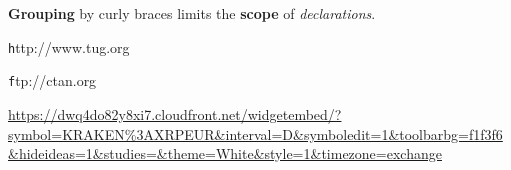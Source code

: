 \documentclass{article}
\newcommand{\keyword}[2][\bfseries]{{#1#2}}
\newcommand{\site}[2][http]{{\texttt #1://#2}}
\begin{document}
\normalfont
\keyword{Grouping} by curly braces limits the
\keyword{scope} of \keyword[\itshape]{declarations}.

\ttfamily
\site{www.tug.org}

\site[ftp]{ctan.org}

\url{https://dwq4do82y8xi7.cloudfront.net/widgetembed/?symbol=KRAKEN%3AXRPEUR&interval=D&symboledit=1&toolbarbg=f1f3f6&hideideas=1&studies=&theme=White&style=1&timezone=exchange}
\end{document}
